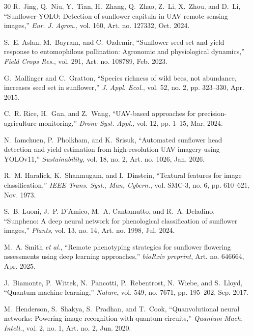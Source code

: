 \documentclass{ieeeaccess}
\begin{document}
\begin{thebibliography}{30}
R.~Jing, Q.~Niu, Y.~Tian, H.~Zhang, Q.~Zhao, Z.~Li, X.~Zhou, and D.~Li, ``Sunflower-YOLO: Detection of sunflower capitula in UAV remote sensing images,'' \textit{Eur. J. Agron.}, vol. 160, Art. no. 127332, Oct. 2024.

S.~E. Aslan, M.~Bayram, and C.~Ozdemir, ``Sunflower seed set and yield response to entomophilous pollination: Agronomic and physiological dynamics,'' \textit{Field Crops Res.}, vol. 291, Art. no. 108789, Feb. 2023.

G.~Mallinger and C.~Gratton, ``Species richness of wild bees, not abundance, increases seed set in sunflower,'' \textit{J. Appl. Ecol.}, vol. 52, no. 2, pp. 323--330, Apr. 2015.

C.~R. Rice, H.~Gan, and Z.~Wang, ``UAV-based approaches for precision-agriculture monitoring,'' \textit{Drone Syst. Appl.}, vol. 12, pp. 1--15, Mar. 2024.

N.~Iamchuen, P.~Pholkham, and K.~Srisuk, ``Automated sunflower head detection and yield estimation from high-resolution UAV imagery using YOLOv11,'' \textit{Sustainability}, vol. 18, no. 2, Art. no. 1026, Jan. 2026.

R.~M. Haralick, K.~Shanmugam, and I.~Dinstein, ``Textural features for image classification,'' \textit{IEEE Trans. Syst., Man, Cybern.}, vol. SMC-3, no. 6, pp. 610--621, Nov. 1973.

S.~B. Luoni, J.~P. D'Amico, M.~A. Cantamutto, and R.~A. Deladino, ``Sunpheno: A deep neural network for phenological classification of sunflower images,'' \textit{Plants}, vol. 13, no. 14, Art. no. 1998, Jul. 2024.

M.~A. Smith \textit{et al.}, ``Remote phenotyping strategies for sunflower flowering assessments using deep learning approaches,'' \textit{bioRxiv preprint}, Art. no. 646664, Apr. 2025.

J.~Biamonte, P.~Wittek, N.~Pancotti, P.~Rebentrost, N.~Wiebe, and S.~Lloyd, ``Quantum machine learning,'' \textit{Nature}, vol. 549, no. 7671, pp. 195--202, Sep. 2017.

M.~Henderson, S.~Shakya, S.~Pradhan, and T.~Cook, ``Quanvolutional neural networks: Powering image recognition with quantum circuits,'' \textit{Quantum Mach. Intell.}, vol. 2, no. 1, Art. no. 2, Jun. 2020.


\end{thebibliography}
\end{document}
